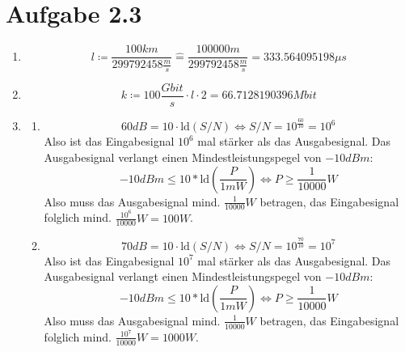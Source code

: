 \documentclass[12pt, a4paper]{article}
\begin{document}
\section*{Aufgabe 2.3}
\begin{enumerate}[label=\alph*)]
	\item	$$l \coloneqq \frac{100 km}{299792458 \frac{m}{s}} \hat{=} \frac{100000m}{299792458 \frac{m}{s}} = 333.564095198 \mu s$$
	\item	$$k \coloneqq 100 \frac{Gbit}{s} \cdot l \cdot 2 = 66.7128190396 Mbit$$
	\item	\begin{enumerate}[label=\roman*)]
				\item	$$60 dB = 10 \cdot \text{ld}(S/N) \Leftrightarrow S/N = 10^{\frac{60}{10}} = 10^6$$
						Also ist das Eingabesignal $10^6$ mal stärker als das Ausgabesignal. Das Ausgabesignal verlangt einen Mindestleistungspegel von $-10 dBm$:
						$$-10 dBm \leq 10 * \text{ld}(\frac{P}{1mW}) \Leftrightarrow P \geq \frac{1}{10000} W$$
						Also muss das Ausgabesignal mind. $\frac{1}{10000} W$ betragen, das Eingabesignal folglich mind. $\frac{10^6}{10000} W = 100 W$.
				\item	$$70 dB = 10 \cdot \text{ld}(S/N) \Leftrightarrow S/N = 10^{\frac{70}{10}} = 10^7$$
						Also ist das Eingabesignal $10^7$ mal stärker als das Ausgabesignal. Das Ausgabesignal verlangt einen Mindestleistungspegel von $-10 dBm$:
						$$-10 dBm \leq 10 * \text{ld}(\frac{P}{1mW}) \Leftrightarrow P \geq \frac{1}{10000} W$$
						Also muss das Ausgabesignal mind. $\frac{1}{10000} W$ betragen, das Eingabesignal folglich mind. $\frac{10^7}{10000} W = 1000 W$.
			\end{enumerate}
\end{enumerate}


\newpage
\end{document}
